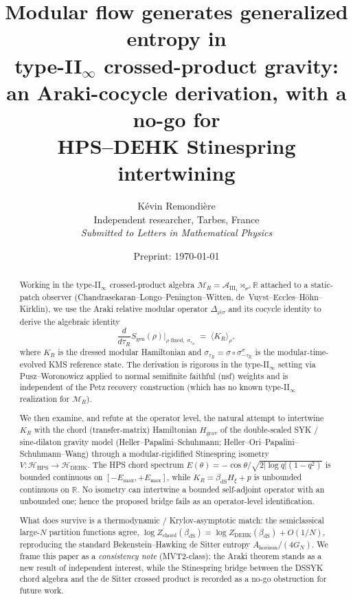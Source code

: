 \documentclass[12pt,a4paper]{article}
\title{Modular flow generates generalized entropy in\\
       type-II$_\infty$ crossed-product gravity:\\[4pt]
       an Araki-cocycle derivation, with a no-go for\\
       HPS--DEHK Stinespring intertwining}
\author{%
  K\'evin Remondi\`ere\\[2pt]
  \small Independent researcher, Tarbes, France\\[2pt]
  \small \textit{Submitted to Letters in Mathematical Physics}
}
\date{Preprint: \today}
\theoremstyle{definition}
\begin{document}
\maketitle

\begin{abstract}
Working in the type-II$_\infty$ crossed-product algebra
$\mathcal{M}_R = \mathcal{A}_{\mathrm{III}_1}\rtimes_{\sigma^{\phi}}\mathbb{R}$
attached to a static-patch observer (Chandrasekaran--Longo--Penington--Witten,
de~Vuyst--Eccles--H\"{o}hn--Kirklin), we use the Araki relative
modular operator $\Delta_{\rho|\sigma}$ and its cocycle identity to
derive the algebraic identity
\[
   \frac{d}{d\tau_R} S_{\mathrm{gen}}(\rho)\bigg|_{\rho \text{ fixed},\;\sigma_{\tau_R}}
   \;=\; \langle K_R \rangle_\rho ,
\]
where $K_R$ is the dressed modular Hamiltonian and $\sigma_{\tau_R}=\sigma\circ
\sigma^{\sigma}_{-\tau_R}$ is the modular-time-evolved KMS reference state.
The derivation is rigorous in the type-II$_\infty$ setting via Pusz--Woronowicz
applied to normal semifinite faithful (nsf) weights and is independent of
the Petz recovery construction (which has no known type-II$_\infty$
realization for $\mathcal{M}_R$).

We then examine, and refute at the operator level, the natural attempt to
intertwine $K_R$ with the chord (transfer-matrix) Hamiltonian
$H_{\mathrm{grav}}$ of the double-scaled SYK / sine-dilaton gravity model
(Heller--Papalini--Schuhmann; Heller--Ori--Papalini--Schuhmann--Wang) through
a modular-rigidified Stinespring isometry $V:\mathcal{H}_{\mathrm{HPS}}\to
\mathcal{H}_{\mathrm{DEHK}}$. The HPS chord spectrum
$E(\theta)=-\cos\theta/\sqrt{2|\log q|(1-q^2)}$ is bounded continuous on
$[-E_{\max},+E_{\max}]$, while $K_R=\beta_{\mathrm{dS}} H_\xi + p$ is
unbounded continuous on $\mathbb{R}$. No isometry can intertwine a bounded
self-adjoint operator with an unbounded one; hence the proposed bridge
fails as an operator-level identification.

What does survive is a thermodynamic / Krylov-asymptotic match: the
semiclassical large-$N$ partition functions agree,
$\log Z_{\mathrm{chord}}(\beta_{\mathrm{dS}}) = \log Z_{\mathrm{DEHK}}
(\beta_{\mathrm{dS}}) + O(1/N)$, reproducing the standard Bekenstein--Hawking
de Sitter entropy $A_{\mathrm{horizon}}/(4 G_N)$. We frame this paper as a
\emph{consistency note} (MVT2-class): the Araki theorem stands as a new
result of independent interest, while the Stinespring bridge between the
DSSYK chord algebra and the de Sitter crossed product is recorded as a
no-go obstruction for future work.
\end{abstract}
\end{document}
